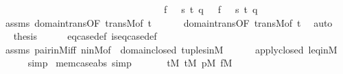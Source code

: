 \begin{isabellebody}
\ \ \ \ \ \ \ \ \ \ \ \ \ \ \ \ \ \ \ \ \ \ \ \ \ \ \ \ \ \ \ \ \ \ {\isacharparenleft}{\kern0pt}f\ {\isacharbackquote}{\kern0pt}\ {\isasymlangle}{}{\isacharcomma}{\kern0pt}\ s{\isacharcomma}{\kern0pt}\ t{}{\isacharcomma}{\kern0pt}\ q{\isasymrangle}\ {\isacharequal}{\kern0pt}{}\ {\isasymlongleftrightarrow}\ f\ {\isacharbackquote}{\kern0pt}\ {\isasymlangle}{}{\isacharcomma}{\kern0pt}\ s{\isacharcomma}{\kern0pt}\ t{}{\isacharcomma}{\kern0pt}\ q{\isasymrangle}{\isacharequal}{\kern0pt}{}{\isacharparenright}{\kern0pt}{\isacharparenright}{\kern0pt}{\isacharparenright}{\kern0pt}{\isachardoublequoteclose}\isanewline
\ \ \ \ \isamarkupfalse%
\ assms\ domain{\isacharunderscore}{\kern0pt}trans{\isacharbrackleft}{\kern0pt}OF\ trans{\isacharunderscore}{\kern0pt}M{\isacharcomma}{\kern0pt}of\ t{}{\isacharbrackright}{\kern0pt}\isanewline
\ \ \ \ \ \ domain{\isacharunderscore}{\kern0pt}trans{\isacharbrackleft}{\kern0pt}OF\ trans{\isacharunderscore}{\kern0pt}M{\isacharcomma}{\kern0pt}of\ t{}{\isacharbrackright}{\kern0pt}\ \isamarkupfalse%
\ auto\isanewline
\ \ \isamarkupfalse%
\ \isamarkupfalse%
\ {\isacharquery}{\kern0pt}thesis\isanewline
\ \ \ \ \isamarkupfalse%
\ eq{\isacharunderscore}{\kern0pt}case{\isacharunderscore}{\kern0pt}def\ is{\isacharunderscore}{\kern0pt}eq{\isacharunderscore}{\kern0pt}case{\isacharunderscore}{\kern0pt}def\isanewline
\ \ \ \ \isamarkupfalse%
\ assms\ pair{\isacharunderscore}{\kern0pt}in{\isacharunderscore}{\kern0pt}M{\isacharunderscore}{\kern0pt}iff\ n{\isacharunderscore}{\kern0pt}in{\isacharunderscore}{\kern0pt}M{\isacharbrackleft}{\kern0pt}of\ {}{\isacharbrackright}{\kern0pt}\ domain{\isacharunderscore}{\kern0pt}closed\ tuples{\isacharunderscore}{\kern0pt}in{\isacharunderscore}{\kern0pt}M\isanewline
\ \ \ \ \ \ apply{\isacharunderscore}{\kern0pt}closed\ leq{\isacharunderscore}{\kern0pt}in{\isacharunderscore}{\kern0pt}M\isanewline
\ \ \ \ \isamarkupfalse%
\ simp\isanewline
{}\isamarkupfalse%
%
\endisatagproof
{\isafoldproof}%
%
\isadelimproof
\isanewline
%
\endisadelimproof
\isanewline
{}\isamarkupfalse%
\ mem{\isacharunderscore}{\kern0pt}case{\isacharunderscore}{\kern0pt}abs\ {\isacharbrackleft}{\kern0pt}simp{\isacharbrackright}{\kern0pt}{\isacharcolon}{\kern0pt}\isanewline
\ \ \isanewline
\ \ \ \ {\isachardoublequoteopen}t{}{\isasymin}M{\isachardoublequoteclose}\ {\isachardoublequoteopen}t{}{\isasymin}M{\isachardoublequoteclose}\ {\isachardoublequoteopen}p{\isasymin}M{\isachardoublequoteclose}\ {\isachardoublequoteopen}f{\isasymin}M{\isachardoublequoteclose}\isanewline

\end{isabellebody}
